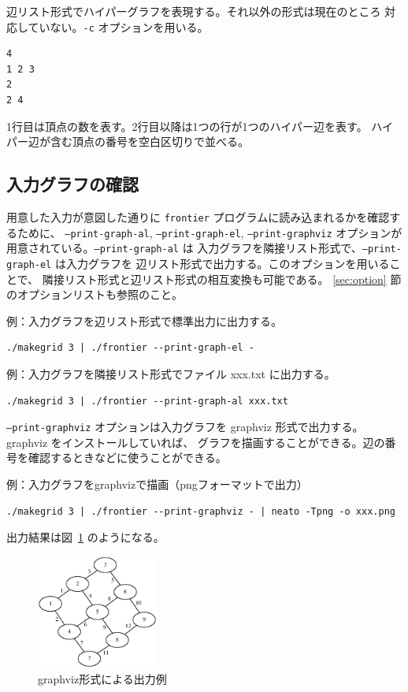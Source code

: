 \documentclass{jsarticle}
\begin{document}
辺リスト形式でハイパーグラフを表現する。それ以外の形式は現在のところ
対応していない。\texttt{-c} オプションを用いる。

\begin{verbatim}
4
1 2 3
2
2 4
\end{verbatim}

1行目は頂点の数を表す。2行目以降は1つの行が1つのハイパー辺を表す。
ハイパー辺が含む頂点の番号を空白区切りで並べる。

\subsection{入力グラフの確認}

用意した入力が意図した通りに \texttt{frontier} プログラムに読み込まれるかを確認するために、
\texttt{--print-graph-al}, \texttt{--print-graph-el},
\texttt{--print-graphviz} オプションが用意されている。\texttt{--print-graph-al} は
入力グラフを隣接リスト形式で、\texttt{--print-graph-el} は入力グラフを
辺リスト形式で出力する。このオプションを用いることで、
隣接リスト形式と辺リスト形式の相互変換も可能である。
\ref{sec:option} 節のオプションリストも参照のこと。

例：入力グラフを辺リスト形式で標準出力に出力する。
\begin{verbatim}
./makegrid 3 | ./frontier --print-graph-el -
\end{verbatim}

例：入力グラフを隣接リスト形式でファイル xxx.txt に出力する。
\begin{verbatim}
./makegrid 3 | ./frontier --print-graph-al xxx.txt
\end{verbatim}

\texttt{--print-graphviz} オプションは入力グラフを
graphviz 形式で出力する。graphviz をインストールしていれば、
グラフを描画することができる。辺の番号を確認するときなどに使うことができる。

例：入力グラフをgraphvizで描画（pngフォーマットで出力）
\begin{verbatim}
./makegrid 3 | ./frontier --print-graphviz - | neato -Tpng -o xxx.png
\end{verbatim}

出力結果は図~\ref{fig:graphviz_example} のようになる。

\begin{figure}[h]
  \begin{center}
    \includegraphics[width=40mm]{graphviz_example.eps}
  \end{center}
  \caption{graphviz形式による出力例}
  \label{fig:graphviz_example}
\end{figure}
\end{document}
